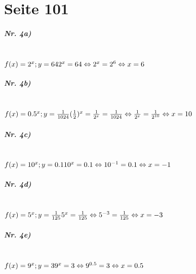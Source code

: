 \documentclass[12pt, a4paper]{report}
\begin{document}
	\bsremovechaptertitle
	\setlength{\columnsep}{1cm}
	\chapter{\textbf{Seite 101}}
	\paragraph{Nr. 4a)} \mbox{} \\
	$
	f(x) = 2^x; y = 64 \\
	2^x = 64 \\
	\Leftrightarrow 2^x = 2^6 \\
	\Leftrightarrow x = 6
	$
	\paragraph{Nr. 4b)} \mbox{} \\
	$
	f(x) = 0.5^x; y = \frac{1}{1024} \\
	(\frac{1}{2})^x = \frac{1}{2^x} = \frac{1}{1024} \\
	\Leftrightarrow \frac{1}{2^x} = \frac{1}{2^{10}} \\
	\Leftrightarrow x = 10
	$
	\paragraph{Nr. 4c)} \mbox{} \\
	$
	f(x) = 10^x; y = 0.1 \\
	10^x = 0.1 \\
	\Leftrightarrow 10^{-1} = 0.1 \\
	\Leftrightarrow x = -1
	$
	\paragraph{Nr. 4d)} \mbox{} \\
	$
	f(x) = 5^x; y = \frac{1}{125} \\
	5^x = \frac{1}{125} \\
	\Leftrightarrow 5^{-3} = \frac{1}{125} \\
	\Leftrightarrow x = -3
	$
	\paragraph{Nr. 4e)} \mbox{} \\
	$
	f(x) = 9^x; y = 3 \\
	9^x = 3 \\
	\Leftrightarrow 9^{0.5} = 3 \\
	\Leftrightarrow x = 0.5
	$
	\newpage
\end{document}
